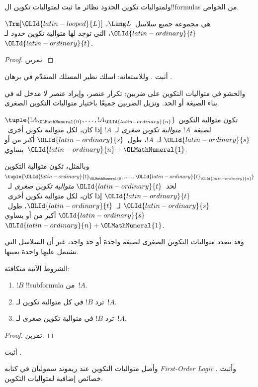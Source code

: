 \documentclass[../../../include/open-logic-section]{subfiles}
\begin{document}
ولمتواليات تكوين الحدود نظائر ما ثبت لمتواليات تكوين
ال!!{formula}s من الخواص.

\begin{prop}
$\Trm[\OLId{latin-looped}{L}]$ هي مجموعة جميع سلاسل~$\Lang L$، $\OLId{latin-ordinary}{t}$، التي توجد لها
متوالية تكوين حدود لـ~$\OLId{latin-ordinary}{t}$.
\end{prop}

\begin{proof}
تمرين.
\end{proof}

\begin{prob}
أثبت .
وللاستعانة: اسلك نظير المسلك المتقدّم في برهان
.
\end{prob}

والحشو في متواليات التكوين على ضربين: تكرار عنصر، وإيراد عنصر
لا مدخل له في بناء الصيغة أو الحد. ونزيل الضربين جميعًا باختيار
متواليات التكوين الصغرى.

\begin{defn}
تكون متوالية التكوين $\tuple{!A_\OLMathNumeral{0}, \ldots, !A_\OLId{latin-ordinary}{n}}$ لصيغة~$!A$
\emph{متوالية تكوين صغرى} لـ~$!A$ إذا كان، لكل متوالية تكوين
أخرى~$\OLId{latin-ordinary}{s}$ لـ~$!A$، طول~$\OLId{latin-ordinary}{s}$ أكبر من أو يساوي~$\OLId{latin-ordinary}{n}+\OLMathNumeral{1}$.

وبالمثل، تكون متوالية التكوين $\tuple{\OLId{latin-ordinary}{t}_\OLMathNumeral{0}, \ldots, \OLId{latin-ordinary}{t}_\OLId{latin-ordinary}{n}}$
لحد~$\OLId{latin-ordinary}{t}$ \emph{متوالية تكوين صغرى} لـ~$\OLId{latin-ordinary}{t}$ إذا كان، لكل متوالية
تكوين أخرى~$\OLId{latin-ordinary}{s}$ لـ~$\OLId{latin-ordinary}{t}$، طول~$\OLId{latin-ordinary}{s}$ أكبر من أو يساوي~$\OLId{latin-ordinary}{n}+\OLMathNumeral{1}$.
\end{defn}

وقد تتعدد متواليات التكوين الصغرى لصيغة واحدة أو حد واحد،
غير أن السلاسل التي تشتمل عليها واحدة بعينها.

\begin{prop}
الشروط الآتية متكافئة:
\begin{enumerate}
    \item $!B$ !!{subformula} من~$!A$.
    \item ترد $!B$ في كل متوالية تكوين لـ~$!A$.
    \item ترد $!B$ في متوالية تكوين صغرى لـ~$!A$.
\end{enumerate}
\end{prop}

\begin{proof}
تمرين.
\end{proof}

\begin{prob}
أثبت .
\end{prob}

\begin{history}
وأصل متواليات التكوين عند ريموند سموليان في كتابه
\emph{First-Order Logic} \citep{Smullyan1968}.
وأثبت \citet{Zuckerman1973} خصائص إضافية لمتواليات التكوين.
\end{history}
\end{document}

